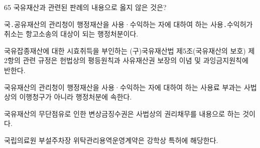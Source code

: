 \begin{question}{65}
국유재산과 관련된 판례의 내용으로 옳지 않은 것은?
\begin{choices}
  \item 국․공유재산의 관리청이 행정재산을 사용·수익하는 자에 대하여 하는 사용․수익허가취소는 항고소송의 대상이 되는 행정처분이다.
  \item 국유잡종재산에 대한 시효취득을 부인하는 (구)국유재산법 제5조(국유재산의 보호) 제2항의 관련 규정은 헌법상의 평등원칙과 사유재산권 보장의 이념 및 과잉금지원칙에 반한다.
  \item 국유재산의 관리청이 행정재산을 사용·수익하는 자에 대하여 하는 사용료 부과는 사법상의 이행청구가 아니라 행정처분에 속한다.
  \item 국유재산의 무단점유로 인한 변상금징수권은 사법상의 권리채무를 내용으로 하는 것이다.
  \item 국립의료원 부설주차장 위탁관리용역운영계약은 강학상 특허에 해당한다.
\end{choices}
\end{question}
